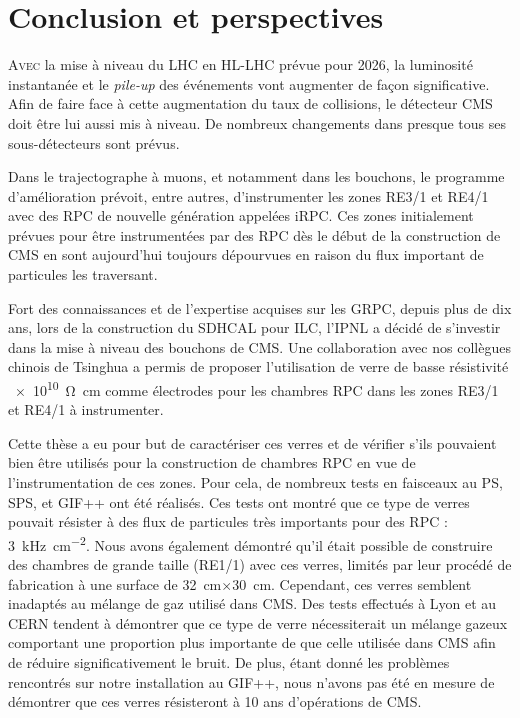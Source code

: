 \chapter{Conclusion et perspectives}
\renewcommand\chapterillustration{CON/CON}
\ThisULCornerWallPaper{1}{\chapterillustration}
\vspace*{-0.5cm}
\lettrine[lines=4, slope=-0.5em,nindent=10pt]{A}{vec} la mise à niveau du LHC en HL-LHC prévue pour \num{2026}, la luminosité instantanée et le \textit{pile-up} des événements vont augmenter de façon significative. Afin de faire face à cette augmentation du taux de collisions, le détecteur CMS doit être lui aussi mis à niveau. De nombreux changements dans presque tous ses sous-détecteurs sont prévus.

Dans le trajectographe à muons, et notamment dans les bouchons, le programme d'amélioration prévoit, entre autres, d'instrumenter les zones RE3/1 et RE4/1 avec des RPC de nouvelle génération appelées iRPC. Ces zones initialement prévues pour être instrumentées par des RPC dès le début de la construction de CMS en sont aujourd'hui toujours dépourvues en raison du flux important de particules les traversant.

Fort des connaissances et de l'expertise acquises sur les GRPC, depuis plus de dix ans, lors de la construction du SDHCAL pour ILC, l'IPNL a décidé de s'investir dans la mise à niveau des bouchons de CMS. Une collaboration avec nos collègues chinois de Tsinghua a permis de proposer l'utilisation de verre de basse résistivité \SI{e10}{\ohm\centi\meter} comme électrodes pour les chambres RPC dans les zones RE3/1 et RE4/1 à instrumenter. 

Cette thèse a eu pour but de caractériser ces verres et de vérifier s'ils pouvaient bien être utilisés pour la construction de chambres RPC en vue de l'instrumentation de ces zones. Pour cela, de nombreux tests en faisceaux au PS, SPS, et GIF++ ont été réalisés. Ces tests ont montré que ce type de verres pouvait résister à des flux de particules très importants pour des RPC : \SI{3}{\kilo\hertz\per\square\centi\meter}. Nous avons également démontré qu'il était possible de construire des chambres de grande taille (RE1/1) avec ces verres, limités par leur procédé de fabrication à une surface de \SI{32}{\centi\meter}$\times$\SI{30}{\centi\meter}. Cependant, ces verres semblent inadaptés au mélange de gaz utilisé dans CMS. Des tests effectués à Lyon et au CERN tendent à démontrer que ce type de verre nécessiterait un mélange gazeux comportant une proportion plus importante de  que celle utilisée dans CMS afin de réduire significativement le bruit. De plus, étant donné les problèmes rencontrés sur notre installation au GIF++, nous n'avons pas été en mesure de démontrer que ces verres résisteront à \num{10} ans d'opérations de CMS.

